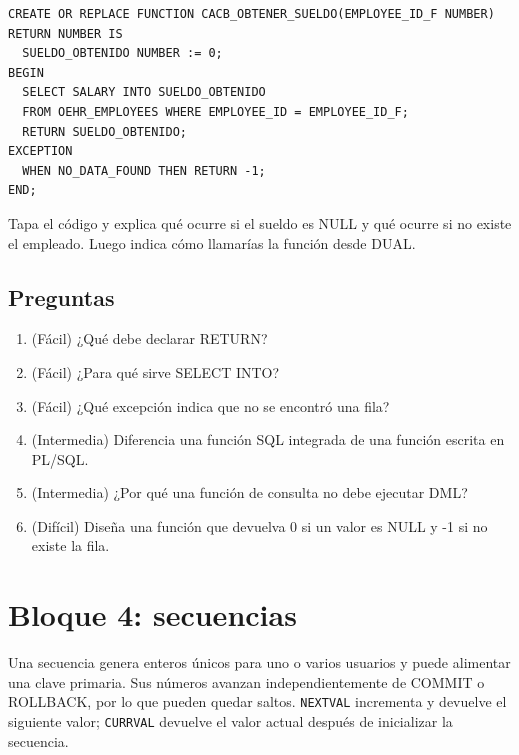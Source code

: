 \documentclass[11pt,a4paper]{article}
\newif\ifmostrarSoluciones
\newcommand{\campo}[1]{\texttt{#1}}
\begin{document}
\begin{lstlisting}
CREATE OR REPLACE FUNCTION CACB_OBTENER_SUELDO(EMPLOYEE_ID_F NUMBER)
RETURN NUMBER IS
  SUELDO_OBTENIDO NUMBER := 0;
BEGIN
  SELECT SALARY INTO SUELDO_OBTENIDO
  FROM OEHR_EMPLOYEES WHERE EMPLOYEE_ID = EMPLOYEE_ID_F;
  RETURN SUELDO_OBTENIDO;
EXCEPTION
  WHEN NO_DATA_FOUND THEN RETURN -1;
END;
\end{lstlisting}

\begin{pausa}Tapa el código y explica qué ocurre si el sueldo es NULL y qué ocurre si no existe el empleado. Luego indica cómo llamarías la función desde DUAL.\end{pausa}
\subsection{Preguntas}
\begin{enumerate}[leftmargin=*]
\item (Fácil) ¿Qué debe declarar RETURN?
\item (Fácil) ¿Para qué sirve SELECT INTO?
\item (Fácil) ¿Qué excepción indica que no se encontró una fila?
\item (Intermedia) Diferencia una función SQL integrada de una función escrita en PL/SQL.
\item (Intermedia) ¿Por qué una función de consulta no debe ejecutar DML?
\item (Difícil) Diseña una función que devuelva 0 si un valor es NULL y -1 si no existe la fila.
\end{enumerate}
\ifmostrarSoluciones\begin{clave}\textbf{Pauta breve:} RETURN declara el tipo y devuelve el valor. SELECT INTO asigna el resultado a una variable. NO_DATA_FOUND indica ausencia de fila. La función de ejemplo usa IF para transformar NULL en 0 y un manejador para devolver -1.\end{clave}\fi

\section{Bloque 4: secuencias}
Una secuencia genera enteros únicos para uno o varios usuarios y puede alimentar una clave primaria.
Sus números avanzan independientemente de COMMIT o ROLLBACK, por lo que pueden quedar saltos.
\campo{NEXTVAL} incrementa y devuelve el siguiente valor; \campo{CURRVAL} devuelve el valor actual
después de inicializar la secuencia.
\end{document}
